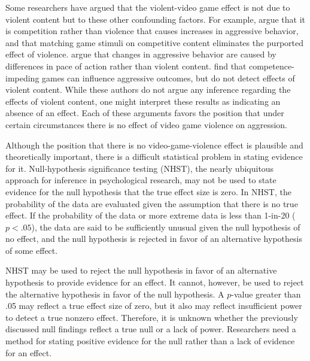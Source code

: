 \documentclass[man]{apa6}
\begin{document}
Some researchers have argued that the violent-video game effect is not due to violent content but to these other confounding factors.  For example, \citet{Adachi:Willoughby:2011} argue that it is competition rather than violence that causes increases in aggressive behavior, and that matching game stimuli on competitive content eliminates the purported effect of violence. \citet{Elson:etal:2013} argue that changes in aggressive behavior are caused by differences in pace of action rather than violent content.  \citet{Przybylski:etal:2014} find that competence-impeding games can influence aggressive outcomes, but do not detect effects of violent content. While these authors do not argue any inference regarding the effects of violent content, one might interpret these results as indicating an absence of an effect. Each of these arguments favors the position that under certain circumstances there is no effect of video game violence on aggression.  

Although the position that there is no video-game-violence effect is plausible and theoretically important, there is a difficult statistical problem in stating evidence for it. Null-hypothesis significance testing (NHST), the nearly ubiquitous approach for inference in psychological research, may not be used to state evidence for the null hypothesis that the true effect size is zero.  In NHST, the probability of the data are evaluated given the assumption that there is no true effect. If the probability of the data or more extreme data is less than 1-in-20 ($p<.05$), the data are said to be sufficiently unusual given the null hypothesis of no effect, and the null hypothesis is rejected in favor of an alternative hypothesis of some effect.

NHST may be used to reject the null hypothesis in favor of an alternative hypothesis to provide evidence for an effect.  It cannot, however, be used to  reject the alternative hypothesis in favor of the null hypothesis. A $p$-value greater than .05 may reflect a true effect size of zero, but it also may reflect insufficient power to detect a true nonzero effect. Therefore, it is unknown whether the previously discussed null findings reflect a true null or a lack of power.  Researchers need a method for stating positive evidence for the null rather than a lack of evidence for an effect.
\end{document}
